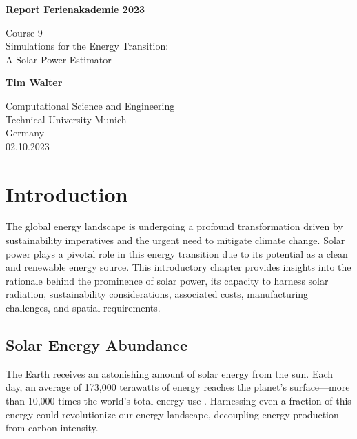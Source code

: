 \documentclass[12pt]{report}
\begin{document}

\begin{titlepage}
    \begin{center}
        \vspace*{1cm}

        \Huge
        \textbf{Report Ferienakademie 2023}

        \vspace{0.5cm}
        \LARGE
        Course 9 \\ Simulations for the Energy Transition: \\A Solar Power Estimator

        \vspace{1.5cm}

        \textbf{Tim Walter}

        \vfill


        \Large
        Computational Science and Engineering\\
        Technical University Munich\\
        Germany\\
        02.10.2023

    \end{center}
\end{titlepage}
\section*{Introduction}
The global energy landscape is undergoing a profound transformation driven by sustainability imperatives and the urgent need to mitigate climate change.
Solar power plays a pivotal role in this energy transition due to its potential as a clean and renewable energy source. 
This introductory chapter provides insights into the rationale behind the prominence of solar power,
its capacity to harness solar radiation, sustainability considerations, associated costs, manufacturing challenges, and spatial requirements.

\subsection*{Solar Energy Abundance}
The Earth receives an astonishing amount of solar energy from the sun.
Each day, an average of 173,000 terawatts of energy reaches the planet's surface—more than 10,000 times the world's total energy use \cite{Energy.gov.01.10.2023}. 
Harnessing even a fraction of this energy could revolutionize our energy landscape, decoupling energy production from carbon intensity.
\end{document}
